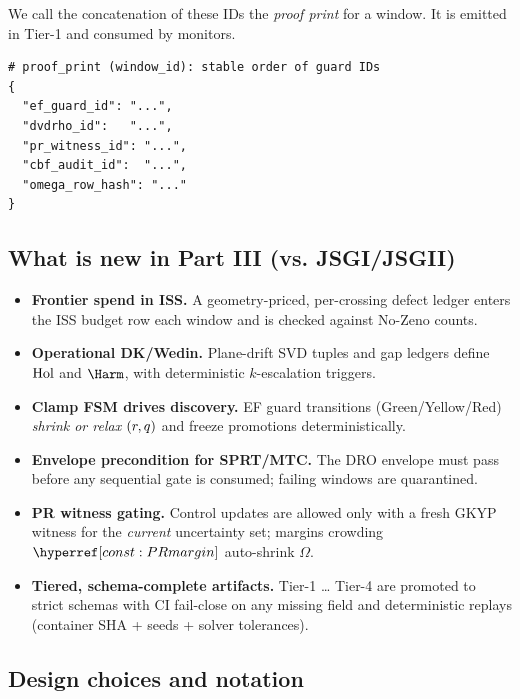 We call the concatenation of these IDs the \emph{proof print} for a window. It is emitted in Tier-1 and consumed by monitors.

\begin{lstlisting}
# proof_print (window_id): stable order of guard IDs
{
  "ef_guard_id": "...",
  "dvdrho_id":   "...",
  "pr_witness_id": "...",
  "cbf_audit_id":  "...",
  "omega_row_hash": "..."
}
\end{lstlisting}

\subsection{What is new in Part III (vs. JSGI/JSGII)}\label{subsec:intro-contrib}
\emph{}

\begin{itemize}[leftmargin=*]
\item \textbf{Frontier spend in ISS.} A geometry-priced, per-crossing defect ledger enters the ISS budget row each window and is checked against No-Zeno counts. 
\item \textbf{Operational DK/Wedin.} Plane-drift SVD tuples and gap ledgers define $\mathrm{Hol}$ and $\Harm$, with deterministic $k$-escalation triggers. 
\item \textbf{Clamp FSM drives discovery.} EF guard transitions (Green/Yellow/Red) \emph{shrink or relax} $(r,q)$ and freeze promotions deterministically. 
\item \textbf{Envelope precondition for SPRT/MTC.} The DRO envelope must pass before any sequential gate is consumed; failing windows are quarantined. 
\item \textbf{PR witness gating.} Control updates are allowed only with a fresh GKYP witness for the \emph{current} uncertainty set; margins crowding $\constref{PRmargin}$ auto-shrink $\Omega$. 
\item \textbf{Tiered, schema-complete artifacts.} Tier-1 … Tier-4 are promoted to strict schemas with CI fail-close on any missing field and deterministic replays (container SHA + seeds + solver tolerances). 
\end{itemize}

\subsection{Design choices and notation}\label{subsec:intro-notation}
\emph{}

